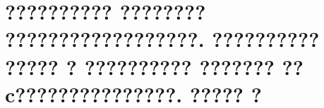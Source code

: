 \section{?????????? ???????? ??????????????????. ?????????? ????? ? ?????????? ??????? ??c???????????????. ????? ?}